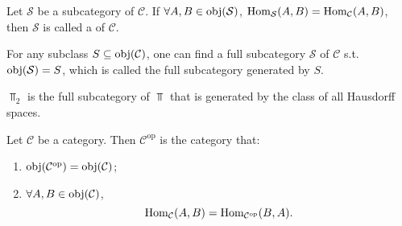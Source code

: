 \documentclass[openany, a5paper]{book}
\begin{document}
\begin{definition}
	Let $\mathcal S$ be a subcategory of $\mathcal C$.
	If $\forall A, B \in \operatorname{obj}(\mathcal S)$, 
	$\operatorname{Hom}_{\mathcal S}(A, B) = \operatorname{Hom}_{\mathcal C}(A, B)$, 
	then $\mathcal S$ is called a  of $\mathcal C$.
\end{definition}

\begin{definition}
	For any subclass $S \subseteq \operatorname{obj}(\mathcal C)$, 
	one can find a full subcategory $\mathcal S$ of $\mathcal C$ s.t.\ $\operatorname{obj}(\mathcal S) = S$, 
	which is called the full subcategory generated by $S$.
\end{definition}

$\Top_2$ is the full subcategory of $\Top$ that is generated by the class of all Hausdorff spaces.

\begin{definition}
	Let $\mathcal C$ be a category.
	Then $\mathcal C^\text{op}$ is the category that:
	\begin{enumerate}
		\item $\operatorname{obj}(\mathcal C^\text{op}) = \operatorname{obj}(\mathcal C)$;
		\item $\forall A, B \in \operatorname{obj}(\mathcal C)$, 
		\begin{equation}
			\operatorname{Hom}_{\mathcal C}(A, B) = \operatorname{Hom}_{\mathcal C^\text{op}}(B, A).
		\end{equation}
	\end{enumerate}
\end{definition}
\end{document}
